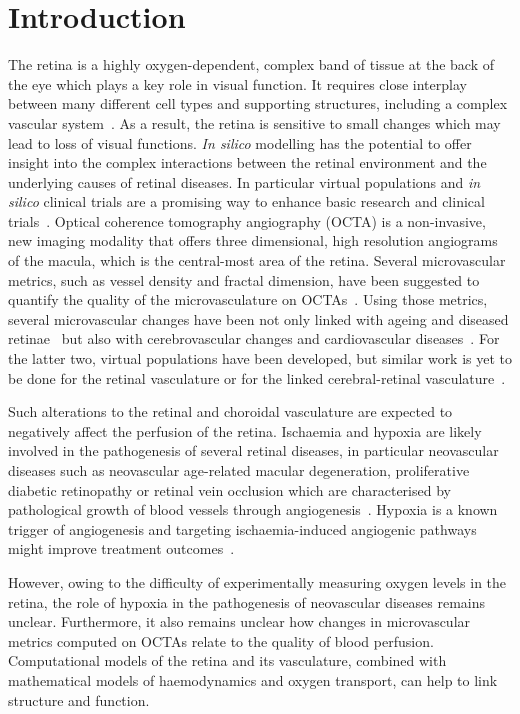 \documentclass[11pt,]{article}
\begin{document}
\section{Introduction}\label{introduction}

The retina is a highly oxygen-dependent, complex band of tissue at the back of the eye which plays a key role in visual function.
It requires close interplay between many different cell types and supporting structures, including a complex vascular system~\cite{Hernandez2023}.
As a result, the retina is sensitive to small changes which may lead to loss of visual functions.
\textit{In silico} modelling has the potential to offer insight into the complex interactions between the retinal environment and the underlying causes of retinal diseases.
In particular virtual populations and \textit{in silico} clinical trials are a promising way to enhance basic research and clinical trials~\cite{Hernandez2023}.
Optical coherence tomography angiography (OCTA) is a non-invasive, new imaging modality that offers three dimensional, high resolution angiograms of the macula, which is the central-most area of the retina.
Several microvascular metrics, such as vessel density and fractal dimension, have been suggested to quantify the quality of the microvasculature on OCTAs~\cite{Chu2016}.
Using those metrics, several microvascular changes have been not only linked with ageing and diseased retinae~\cite{ElBouri_2021,Ma2021,Trinh_2019,Told2023,Xue_2021} but also with cerebrovascular changes and cardiovascular diseases~\cite{Pleouras_2021,Graff_2021,LopezCuenca_2022}.
For the latter two, virtual populations have been developed, but similar work is yet to be done for the retinal vasculature or for the linked cerebral-retinal vasculature~\cite{Hernandez2023}.

Such alterations to the retinal and choroidal vasculature are expected to negatively affect the perfusion of the retina.
Ischaemia and hypoxia are likely involved in the pathogenesis of several retinal diseases, in
particular neovascular diseases such as neovascular age-related
macular degeneration, proliferative diabetic retinopathy or retinal
vein occlusion which are characterised by pathological growth of blood
vessels through angiogenesis~\cite{Medina_2016}.
Hypoxia is a known trigger of angiogenesis and targeting ischaemia-induced angiogenic pathways might improve treatment outcomes~\cite{UsuiOuchi2020}.

However, owing to the difficulty of experimentally measuring oxygen
levels in the retina, the role of hypoxia in the pathogenesis of
neovascular diseases remains unclear. Furthermore, it also remains unclear
how changes in microvascular metrics computed on OCTAs relate to the
quality of blood perfusion. Computational models of the retina and its
vasculature, combined with mathematical models of haemodynamics and
oxygen transport, can help to link structure and function.
\end{document}
